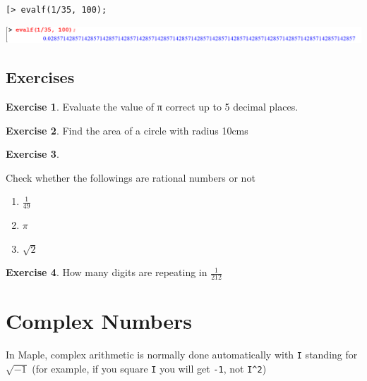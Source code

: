 \documentclass[
]{book}
\providecommand{\tightlist}{%
  \setlength{\itemsep}{0pt}\setlength{\parskip}{0pt}}
\theoremstyle{definition}
\theoremstyle{definition}
\theoremstyle{definition}
\newtheorem{exercise}{Exercise}[chapter]
\theoremstyle{definition}
\theoremstyle{remark}
\begin{document}
\begin{verbatim}
[> evalf(1/35, 100);
\end{verbatim}

\includegraphics{figures/Lesson 1/fig41.png}

\subsection{Exercises}\label{exercises-1}

\begin{exercise}
\protect\hypertarget{exr:unnamed-chunk-6}{}\label{exr:unnamed-chunk-6}Evaluate the value of π correct up to 5 decimal places.
\end{exercise}

\begin{exercise}
\protect\hypertarget{exr:unnamed-chunk-7}{}\label{exr:unnamed-chunk-7}Find the area of a circle with radius 10cms
\end{exercise}

\begin{exercise}
\protect\hypertarget{exr:unnamed-chunk-8}{}\label{exr:unnamed-chunk-8}

Check whether the followings are rational numbers or not

\begin{enumerate}
\def\labelenumi{\roman{enumi}.}
\tightlist
\item
  \(\frac{1}{49}\)
\item
  \(\pi\)
\item
  \(\sqrt{2}\)
\end{enumerate}

\end{exercise}

\begin{exercise}
\protect\hypertarget{exr:unnamed-chunk-9}{}\label{exr:unnamed-chunk-9}How many digits are repeating in \(\frac{1}{212}\)
\end{exercise}

\section{Complex Numbers}\label{complex-numbers}

In Maple, complex arithmetic is normally done automatically with \texttt{I} standing for \(\sqrt{−1}\) (for example, if you square \texttt{I} you will get \texttt{-1}, not \texttt{I\^{}2})
\end{document}
